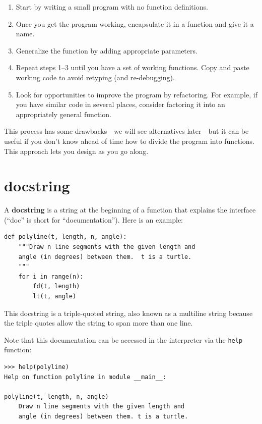 \documentclass[10pt]{book}
\begin{document}
\begin{enumerate}

\item Start by writing a small program with no function definitions.

\item Once you get the program working, encapsulate it in a function
and give it a name.

\item Generalize the function by adding appropriate parameters.

\item Repeat steps 1--3 until you have a set of working functions.
Copy and paste working code to avoid retyping (and re-debugging).

\item Look for opportunities to improve the program by refactoring.
For example, if you have similar code in several places, consider
factoring it into an appropriately general function.

\end{enumerate}

This process has some drawbacks---we will see alternatives later---but
it can be useful if you don't know ahead of time how to divide the
program into functions.  This approach lets you design as you go
along.


\section{docstring}
\label{docstring}

A {\bf docstring} is a string at the beginning of a function that
explains the interface (``doc'' is short for ``documentation'').  Here
is an example:

\beforeverb
\begin{verbatim}
def polyline(t, length, n, angle):
    """Draw n line segments with the given length and
    angle (in degrees) between them.  t is a turtle.
    """    
    for i in range(n):
        fd(t, length)
        lt(t, angle)
\end{verbatim}
\afterverb
%
This docstring is a triple-quoted string, also known
as a multiline string because the triple quotes allow the string
to span more than one line.

Note that this documentation can be accessed in the interpreter via the {\tt help} function:

\beforeverb
\begin{verbatim}
>>> help(polyline)
Help on function polyline in module __main__:

polyline(t, length, n, angle)
    Draw n line segments with the given length and
    angle (in degrees) between them. t is a turtle.

\end{verbatim}
\afterverb
%
\end{document}
